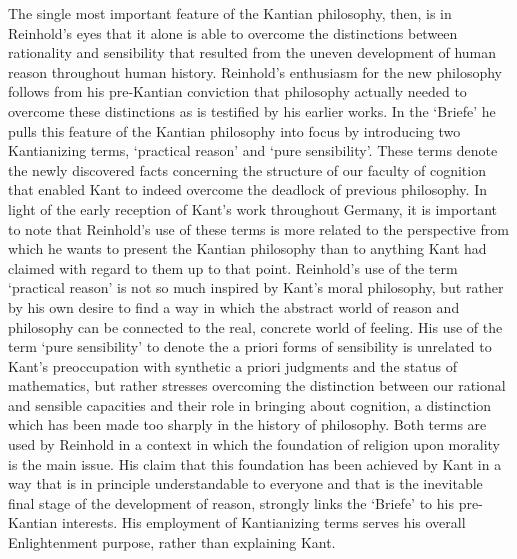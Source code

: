 The single most important feature of the Kantian philosophy, then, is in Reinhold's eyes that it alone is able to overcome the distinctions between rationality and sensibility that resulted from the uneven development of human reason throughout human history. Reinhold's enthusiasm for the new philosophy follows from his pre{-}Kantian conviction that philosophy actually needed to overcome these distinctions as is testified by his earlier works. In the `Briefe' he pulls this feature of the Kantian philosophy into focus by introducing two Kantianizing terms, `practical reason' and `pure sensibility'. These terms denote the newly discovered facts concerning the structure of our faculty of cognition that enabled Kant to indeed overcome the deadlock of previous philosophy. In light of the early reception of Kant's work throughout Germany, it is important to note that Reinhold's use of these terms is more related to the perspective from which he wants to present the Kantian philosophy than to anything Kant had claimed with regard to them up to that point. Reinhold's use of the term `practical reason' is not so much inspired by Kant's moral philosophy, but rather by his own desire to find a way in which the abstract world of reason and philosophy can be connected to the real, concrete world of feeling. His use of the term `pure sensibility' to denote the a priori forms of sensibility is unrelated to Kant's preoccupation with synthetic a priori judgments and the status of mathematics, but rather stresses overcoming the distinction between our rational and sensible capacities and their role in bringing about cognition, a distinction which has been made too sharply in the history of philosophy. Both terms are used by Reinhold in a context in which the foundation of religion upon morality is the main issue. His claim that this foundation has been achieved by Kant in a way that is in principle understandable to everyone and that is the inevitable final stage of the development of reason, strongly links the `Briefe' to his pre{-}Kantian interests. His employment of Kantianizing terms serves his overall Enlightenment purpose, rather than explaining Kant. 

